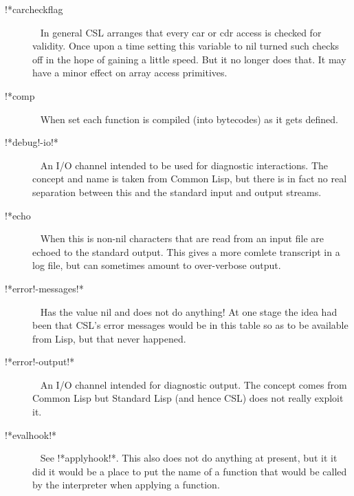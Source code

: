 \documentclass[a4paper,11pt]{article}
\begin{document}
\begin{description}
\item [{\ttfamily !*carcheckflag}]  ~\newline
In general CSL arranges that every {\ttfamily car} or {\ttfamily cdr} access
is checked for validity. Once upon a time setting this variable to nil
turned such checks off in the hope of gaining a little speed. But it no
longer does that. It may have a minor effect on array access primitives.

\item [{\ttfamily !*comp}]  ~\newline
When set each function is compiled (into bytecodes) as it gets defined.

\item [{\ttfamily !*debug!-io!*}]  ~\newline
An I/O channel intended to be used for diagnostic interactions. The concept
and name is taken from Common Lisp, but there is in fact no real separation
between this and the standard input and output streams.

\item [{\ttfamily !*echo}]  ~\newline
When this is non-nil characters that are read from an input file are
echoed to the standard output. This gives a more comlete transcript in
a log file, but can sometimes amount to over-verbose output.

\item [{\ttfamily !*error!-messages!*}]  ~\newline
Has the value nil and does not do anything! At one stage the idea had been
that CSL's error messages would be in this table so as to be available
from Lisp, but that never happened.

\item [{\ttfamily !*error!-output!*}]  ~\newline
An I/O channel intended for diagnostic output. The concept comes from
Common Lisp but Standard Lisp (and hence CSL) does not really exploit it.

\item [{\ttfamily !*evalhook!*}]  ~\newline
See {\ttfamily !*applyhook!*}. This also does not do anything at present,
but it it did it would be a place to put the name of a function that
would be called by the interpreter when applying a function.


\end{description}
\end{document}
